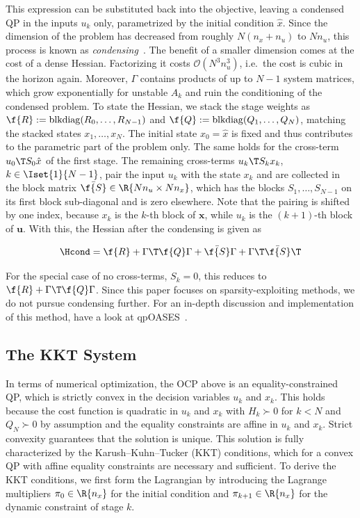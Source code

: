 This expression can be substituted back into the objective, leaving a condensed QP in the inputs $u_k$ only, parametrized by the initial condition $\hat{x}$.
Since the dimension of the problem has decreased from roughly $N(n_x + n_u)$ to $N n_u$, this process is known as \textit{condensing}~\cite{bock1984multiple,frison2013fast}.
The benefit of a smaller dimension comes at the cost of a dense Hessian.
Factorizing it costs $\mathcal{O}\!\left(N^3 n_u^3\right)$, i.e.\ the cost is cubic in the horizon again.
Moreover, $\Gamma$ contains products of up to $N-1$ system matrices, which grow exponentially for unstable $A_k$ and ruin the conditioning of the condensed problem.
To state the Hessian, we stack the stage weights as $\f{R} := \operatorname{blkdiag}(R_0, \dots, R_{N-1})$ and $\f{Q} := \operatorname{blkdiag}(Q_1, \dots, Q_N)$, matching the stacked states $x_1,\dots,x_N$.
The initial state $x_0 = \hat{x}$ is fixed and thus contributes to the parametric part of the problem only.
The same holds for the cross-term $u_0\T S_0 \hat{x}$ of the first stage.
The remaining cross-terms $u_k\T S_k x_k$, $k \in \Iset{1}{N-1}$, pair the input $u_k$ with the state $x_k$ and are collected in the block matrix $\bar{\f{S}} \in \R{N n_u \times N n_x}$, which has the blocks $S_1, \dots, S_{N-1}$ on its first block sub-diagonal and is zero elsewhere.
Note that the pairing is shifted by one index, because $x_k$ is the $k$-th block of $\mathbf{x}$, while $u_k$ is the $(k+1)$-th block of $\mathbf{u}$.
With this, the Hessian after the condensing is given as

\[
\Hcond = \f{R} + \Gamma\T \f{Q} \Gamma + \bar{\f{S}} \Gamma + \Gamma\T \bar{\f{S}}\T
\]

For the special case of no cross-terms, $S_k = 0$, this reduces to $\f{R} + \Gamma\T \f{Q} \Gamma$.
Since this paper focuses on sparsity-exploiting methods, we do not pursue condensing further.
For an in-depth discussion and implementation of this method, have a look at qpOASES~\cite{ferreau2014qpoases}.

\subsection{The KKT System}
\label{sec:kkt}

In terms of numerical optimization, the OCP above is an equality-constrained QP, which is strictly convex in the decision variables $u_k$ and $x_k$.
This holds because the cost function is quadratic in $u_k$ and $x_k$ with $H_k \succ 0$ for $k < N$ and $Q_N \succ 0$ by assumption and the equality constraints are affine in $u_k$ and $x_k$.
Strict convexity guarantees that the solution is unique.
This solution is fully characterized by the Karush--Kuhn--Tucker (KKT) conditions, which for a convex QP with affine equality constraints are necessary and sufficient.
To derive the KKT conditions, we first form the Lagrangian by introducing the Lagrange multipliers $\pi_0 \in \R{n_x}$ for the initial condition and $\pi_{k+1} \in \R{n_x}$ for the dynamic constraint of stage $k$.

